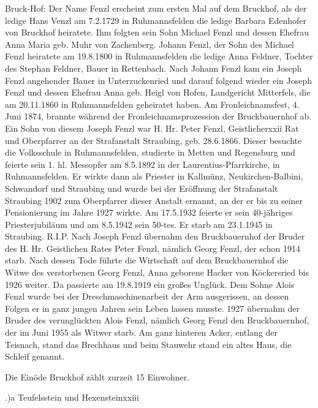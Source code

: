 Bruck-Hof: Der Name Fenzl erscheint zum ersten Mal auf dem Bruckhof, als der
ledige Hans Venzl am 7.2.1729 in Ruhmannsfelden die ledige Barbara Edenhofer von
Bruckhof heiratete. Ihm folgten sein Sohn Michael Fenzl und dessen Ehefrau Anna
Maria geb. Muhr von Zachenberg. Johann Fenzl, der Sohn des Michael Fenzl
heiratete am 19.8.1800 in Ruhmannsfelden die ledige Anna Feldner, Tochter des
Stephan Feldner, Bauer in Rettenbach. Nach Johann Fenzl kam ein Joseph Fenzl
angehender Bauer in Unterzuckenried und darauf folgend wieder ein Joseph Fenzl
und dessen Ehefrau Anna geb. Heigl von Hofen, Landgericht Mitterfels, die am
20.11.1860 in Ruhmannsfelden geheiratet haben. Am Fronleichnamsfest, 4. Juni
1874, brannte während der Fronleichnamsprozession der Bruckbauernhof ab. Ein
Sohn von diesem Joseph Fenzl war H. Hr. Peter Fenzl, Geistlicherxxii Rat und
Oberpfarrer an der Strafanstalt Straubing, geb. 28.6.1866. Dieser besuchte die
Volksschule in Ruhmannsfelden, studierte in Metten und Regensburg und feierte
sein 1. hl. Messopfer am 8.5.1892 in der Laurentius-Pfarrkirche, in
Ruhmannsfelden. Er wirkte dann als Priester in Kallmünz, Neukirchen-Balbini,
Schwandorf und Straubing und wurde bei der Eröffnung der Strafanstalt Straubing
1902 zum Oberpfarrer dieser Anstalt ernannt, an der er bis zu seiner
Pensionierung im Jahre 1927 wirkte. Am 17.5.1932 feierte er sein 40-jähriges
Priesterjubiläum und am 8.5.1942 sein 50-tes. Er starb am 23.1.1945 in
Straubing. R.I.P. Nach Joseph Fenzl übernahm den Bruckbauernhof der Bruder des
H. Hr. Geistlichen Rates Peter Fenzl, nämlich Georg Fenzl, der schon 1914 starb.
Nach dessen Tode führte die Wirtschaft auf dem Bruckbauernhof die Witwe des
verstorbenen Georg Fenzl, Anna geborene Hacker von Köckersried bis 1926 weiter.
Da passierte am 19.8.1919 ein großes Unglück. Dem Sohne Alois Fenzl wurde bei
der Dreschmaschinenarbeit der Arm ausgerissen, an dessen Folgen er in ganz
jungen Jahren sein Leben lassen musste. 1927 übernahm der Bruder des
verunglückten Alois Fenzl, nämlich Georg Fenzl den Bruckbauernhof, der im Juni
1955 als Witwer starb. Am ganz hinteren Acker, entlang der Teisnach, stand das
Brechhaus und beim Stauwehr stand ein altes Haus, die Schleif genannt.

Die Einöde Bruckhof zählt zurzeit 15 Einwohner.

.)a Teufelsstein und Hexensteinxxiii

